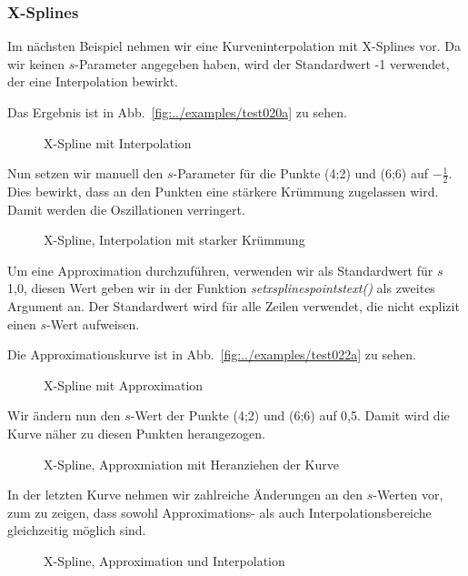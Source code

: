 \documentclass[ngerman,origlongtable]{scrartcl}
\newcommand{\includepgfimage}[2]{%
\begin{figure}%
{\centering%
\caption{#2}\label{fig:#1}%
}%
\end{figure}%
}
\begin{document}
\subsubsection{X-Splines}
Im nächsten Beispiel nehmen wir eine Kurveninterpolation mit X-Splines
vor. Da wir keinen \(s\)-Parameter angegeben haben, wird der
Standardwert -1 verwendet, der eine Interpolation bewirkt.

Das Ergebnis ist in Abb.~\vref{fig:../examples/test020a} zu sehen.
\clearpage
\includepgfimage{../examples/test020a}{X-Spline mit Interpolation}
\clearpage
Nun setzen wir manuell den \(s\)-Parameter für die Punkte (4;2) und (6;6)
auf \(-\tfrac{1}{2}\). Dies bewirkt, dass an den Punkten eine stärkere
Krümmung zugelassen wird. Damit werden die Oszillationen verringert.

\includepgfimage{../examples/test021a}{X-Spline, Interpolation mit starker Krümmung}
\clearpage
Um eine Approximation durchzuführen, verwenden wir als Standardwert
für \(s\) 1,0, diesen Wert geben wir in der Funktion
\textit{set\textunderscore{}xsplines\textunderscore{}points\textunderscore{}text()\/}
als zweites Argument an. Der Standardwert wird für alle Zeilen verwendet,
die nicht explizit einen \(s\)-Wert aufweisen.

Die Approximationskurve ist in Abb.~\vref{fig:../examples/test022a} zu sehen.
\clearpage
\includepgfimage{../examples/test022a}{X-Spline mit Approximation}
\clearpage
Wir ändern nun den \(s\)-Wert der Punkte (4;2) und (6;6) auf 0,5.
Damit wird die Kurve näher zu diesen Punkten herangezogen.

\clearpage
\includepgfimage{../examples/test023a}{X-Spline, Approxmiation mit Heranziehen der Kurve}
\clearpage
In der letzten Kurve nehmen wir zahlreiche Änderungen an den \(s\)-Werten
vor, zum zu zeigen, dass sowohl Approximations- als auch Interpolationsbereiche
gleichzeitig möglich sind.

\clearpage
\includepgfimage{../examples/test024a}{X-Spline, Approximation und Interpolation}
\clearpage
\end{document}
